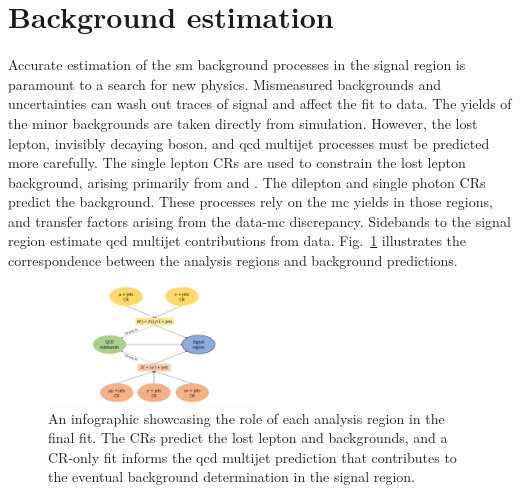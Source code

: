 \section{Background estimation}
\label{sec:htoinv_background_est}


Accurate estimation of the \acrlong{sm} background processes in the signal region is paramount to a search for new physics. Mismeasured backgrounds and uncertainties can wash out traces of signal and affect the fit to data. The yields of the minor backgrounds are taken directly from simulation. However, the lost lepton, invisibly decaying \PZ boson, and \acrshort{qcd} multijet processes must be predicted more carefully. The single lepton \glspl{CR} are used to constrain the lost lepton background, arising primarily from \ttbarpjets and \wtolnupjets. The dilepton and single photon \glspl{CR} predict the \ztonunupjets background. These processes rely on the \acrlong{mc} yields in those regions, and transfer factors arising from the data-\acrshort{mc} discrepancy. Sidebands to the signal region estimate \acrshort{qcd} multijet contributions from data. Fig.~\ref{fig:htoinv_fit_overview} illustrates the correspondence between the analysis regions and background predictions.

\begin{figure}[htbp]
    \centering
    \includegraphics[width=0.5\textwidth]{figures/fit_overview.pdf}
    \caption[An infographic showcasing the role of each analysis region in the final fit]{An infographic showcasing the role of each analysis region in the final fit. The \glspl{CR} predict the lost lepton and \ztonunu backgrounds, and a \gls{CR}-only fit informs the \acrshort{qcd} multijet prediction that contributes to the eventual background determination in the signal region.}
    \label{fig:htoinv_fit_overview}
\end{figure}




